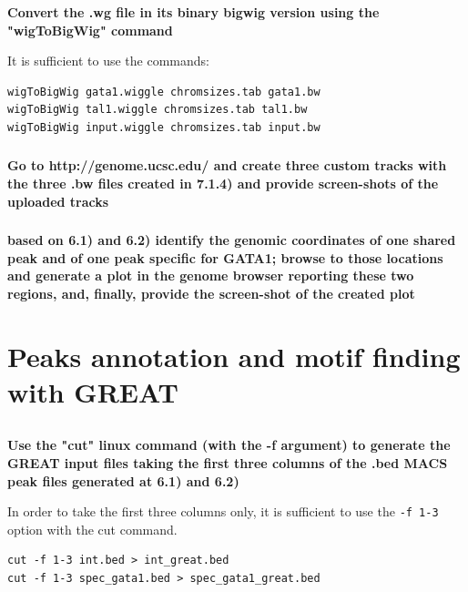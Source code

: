 \documentclass[12pt, a4paper]{article}
\begin{document}
\subsubsection{}
\textbf{Convert the .wg file in its binary bigwig version using the "wigToBigWig" command}

It is sufficient to use the commands:

\begin{verbatim}
wigToBigWig gata1.wiggle chromsizes.tab gata1.bw
wigToBigWig tal1.wiggle chromsizes.tab tal1.bw
wigToBigWig input.wiggle chromsizes.tab input.bw
\end{verbatim}

\subsubsection{}
\textbf{Go to http://genome.ucsc.edu/ and create three custom tracks with the three .bw files created in 7.1.4) and provide screen-shots of the uploaded tracks}

\subsubsection{}
\textbf{based on 6.1) and 6.2) identify the genomic coordinates of one shared peak and of one peak specific for GATA1; browse to those locations and generate a plot in the genome browser reporting these two regions, and, finally, provide the screen-shot of the created plot}


\section{Peaks annotation and motif finding with GREAT}

\subsection{}
\textbf{Use the "cut" linux command (with the -f argument) to generate the GREAT input files taking the first three columns of the .bed MACS peak files generated at 6.1) and 6.2)}

In order to take the first three columns only, it is sufficient to use the \verb|-f 1-3| option with the cut command.

\begin{verbatim}
cut -f 1-3 int.bed > int_great.bed
cut -f 1-3 spec_gata1.bed > spec_gata1_great.bed
\end{verbatim}
\end{document}
